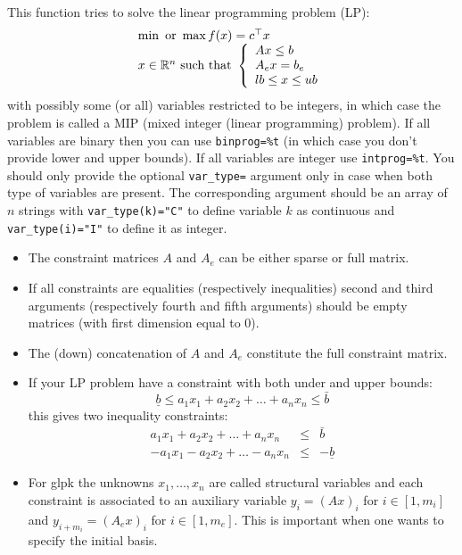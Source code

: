 \begin{mandescription}
This function tries to solve the linear programming problem (LP):
$$
\begin{array}{l}
\min \mbox{ or } \max f(x) = c^{\top} x\\
x \in \mathbb R^n \mbox{ such that } \left\{ \begin{array}{l} 
  A x \le b \\
  A_e x = b_e \\
  lb \le x \le ub 
\end{array}\right.
\end{array}
$$
with possibly some (or all) variables restricted to be integers, in which
case the problem is called a MIP (mixed integer (linear programming) problem).
If all variables are binary then you can use \verb+binprog=%t+ (in which case
you don't provide lower and upper bounds). If all variables are 
integer use \verb+intprog=%t+. You should only provide the optional
\verb+var_type=+ argument only in case when both type of variables are
present.  The corresponding argument should be an array of $n$ strings 
with \verb+var_type(k)="C"+ to define variable $k$ as continuous 
and \verb+var_type(i)="I"+  to define it as integer.

\begin{itemize}
\item The constraint matrices $A$ and $A_e$ can be either sparse or full matrix.
\item If all constraints are equalities (respectively inequalities) second 
and third arguments (respectively fourth and fifth arguments) should 
be empty matrices (with first dimension equal to 0). 
\item The (down) concatenation of $A$ and $A_e$ constitute the full
constraint matrix.
\item If your LP problem have a constraint with both under and upper bounds:
$$
   \underline{b} \le a_1 x_1 + a_2 x_2 + \dots + a_n x_n \le \bar{b}
$$
this gives two inequality constraints:
$$
\begin{array}{rcl}
 a_1 x_1 + a_2 x_2 + \dots + a_n x_n  & \le & \bar{b}\\
 -a_1 x_1 - a_2 x_2 + \dots - a_n x_n &  \le & -\underline{b}
\end{array}
$$
\item For glpk the unknowns $x_1, \dots, x_n$ are called structural variables
and each constraint is associated to an auxiliary variable $y_i = (Ax)_i$ 
for $i \in [1,m_i]$ and $y_{i+m_i} = (A_ex)_i$ for  $i \in [1,m_e]$. This is
important when one wants to specify the initial basis.
\end{itemize}


\end{mandescription}
